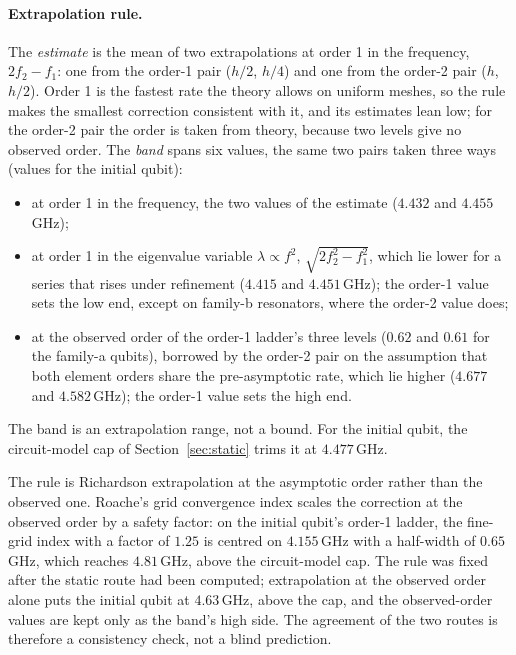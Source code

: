 \documentclass{anvil-paper}
\begin{document}
\paragraph{Extrapolation rule.}
The \emph{estimate} is the mean of two extrapolations at order 1 in the
frequency, $2f_2 - f_1$: one from the order-1 pair ($h/2$, $h/4$) and one
from the order-2 pair ($h$, $h/2$). Order 1 is the fastest rate the theory
allows on uniform meshes, so the rule makes the smallest correction
consistent with it, and its estimates lean low; for the order-2 pair the
order is taken from theory, because two levels give no observed order. The
\emph{band} spans six values, the same two pairs taken three ways (values
for the initial qubit):
\begin{itemize}\setlength{\itemsep}{0pt}
  \item at order 1 in the frequency, the two values of the estimate
    ($4.432$ and $4.455$\,GHz);
  \item at order 1 in the eigenvalue variable $\lambda\propto f^2$,
    $\sqrt{2f_2^2 - f_1^2}$, which lie lower for a series that rises
    under refinement ($4.415$ and $4.451$\,GHz); the order-1 value sets
    the low end, except on family-b resonators, where the order-2 value
    does;
  \item at the observed order of the order-1 ladder's three levels
    ($0.62$ and $0.61$ for the family-a qubits), borrowed by the order-2
    pair on the assumption that both element orders share the
    pre-asymptotic rate, which lie higher ($4.677$ and $4.582$\,GHz); the
    order-1 value sets the high end.
\end{itemize}
The band is an extrapolation range, not a bound. For the initial qubit,
the circuit-model cap of Section~\ref{sec:static} trims it at
$4.477$\,GHz.

The rule is Richardson extrapolation \citep{richardson1911approximate} at
the asymptotic order rather than the observed one. Roache's grid
convergence index \citep{roache1994perspective} scales the correction at
the observed order by a safety factor: on the initial qubit's order-1
ladder, the fine-grid index with a factor of $1.25$ is centred on
$4.155$\,GHz with a half-width of $0.65$\,GHz, which reaches $4.81$\,GHz,
above the circuit-model cap. The rule was fixed after the static route had
been computed; extrapolation at the observed order alone puts the initial
qubit at $4.63$\,GHz, above the cap, and the observed-order values are kept
only as the band's high side. The agreement of the two routes is therefore
a consistency check, not a blind prediction.
\end{document}
